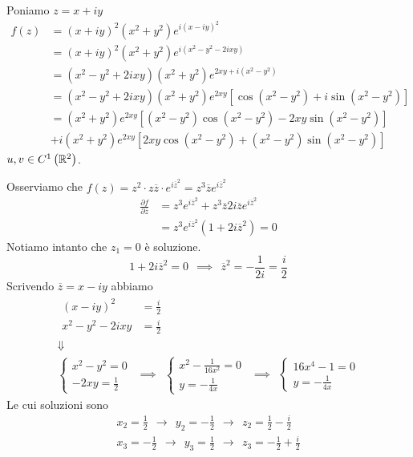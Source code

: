 Poniamo $z = x + iy$
\begin{align*}
f(z) & = \left(x + iy\right)^{2}\left(x^{2} + y^{2}\right) e^{i\left(x - iy\right)^{2}}\\
 & = \left(x + iy\right)^{2}\left(x^{2} + y^{2}\right) e^{i\left(x^{2} - y^{2} - 2ixy\right)}\\
 & = \left(x^{2} - y^{2} + 2ixy\right)\left(x^{2} + y^{2}\right) e^{2xy + i\left(x^{2} - y^{2}\right)}\\
 & = \left(x^{2} - y^{2} + 2ixy\right)\left(x^{2} + y^{2}\right) e^{2xy}\left[\cos\left(x^{2} - y^{2}\right) + i\sin\left(x^{2} - y^{2}\right)\right]\\
 & = \left(x^{2} + y^{2}\right) e^{2xy}\left[\left(x^{2} - y^{2}\right)\cos\left(x^{2} - y^{2}\right) - 2xy\sin\left(x^{2} - y^{2}\right)\right]\\
 & + i\left(x^{2} + y^{2}\right) e^{2xy}\left[ 2xy\cos\left(x^{2} - y^{2}\right) + \left(x^{2} - y^{2}\right)\sin\left(x^{2} - y^{2}\right)\right]
\end{align*}
$u, v\in C^{1}\left(\mathbb{R}^{2}\right)$.

Osserviamo che $f(z) = z^{2} \cdot z\overline{z} \cdot e^{i\overline{z}^{2}} = z^{3}\overline{z} e^{i\overline{z}^{2}}$
\begin{align*}
\frac{\partial f}{\partial \overline{z}} & = z^{3} e^{i\overline{z}^{2}} + z^{3}\overline{z} 2i\overline{z} e^{i\overline{z}^{2}}\\
 & = z^{3} e^{i\overline{z}^{2}}\left(1 + 2i\overline{z}^{2}\right) = 0
\end{align*}
Notiamo intanto che $z_{1} = 0$ è soluzione.
\begin{equation*}
1 + 2i\overline{z}^{2} = 0\ \ \implies \ \ \overline{z}^{2} = - \frac{1}{2i} = \frac{i}{2}
\end{equation*}
Scrivendo $\overline{z} = x - iy$ abbiamo
\begin{gather*}
\begin{aligned}
\left(x - iy\right)^{2} & = \frac{i}{2}\\
x^{2} - y^{2} - 2ixy & = \frac{i}{2}
\end{aligned}\\
\Downarrow \\
\begin{cases}
x^{2} - y^{2} = 0\\
- 2xy = \frac{1}{2}
\end{cases} \ \ \implies \ \
\begin{cases}
x^{2} - \frac{1}{16x^{2}} = 0\\
y = -\frac{1}{4x}
\end{cases} \ \ \implies \ \
\begin{cases}
16x^{4} - 1 = 0\\
y = -\frac{1}{4x}
\end{cases}
\end{gather*}
Le cui soluzioni sono
\begin{gather*}
x_{2} = \frac{1}{2} \ \ \rightarrow \ \ y_{2} = - \frac{1}{2} \ \ \rightarrow \ \ z_{2} = \frac{1}{2} - \frac{i}{2}\\
x_{3} = - \frac{1}{2} \ \ \rightarrow \ \ y_{3} = \frac{1}{2} \ \ \rightarrow \ \ z_{3} = - \frac{1}{2} + \frac{i}{2}
\end{gather*}

